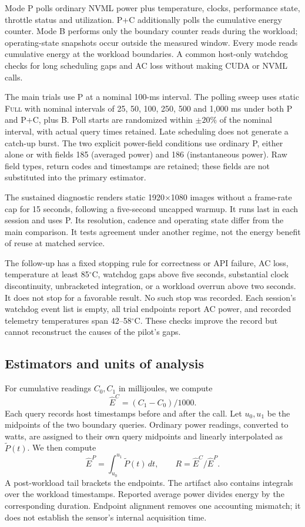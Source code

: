 \documentclass[10pt,conference]{IEEEtran}
\newcommand{\Full}{\textsc{Full}}
\begin{document}
Mode P polls ordinary NVML power plus temperature, clocks, performance state, throttle status and utilization. P+C additionally polls the cumulative energy counter. Mode B performs only the boundary counter reads during the workload; operating-state snapshots occur outside the measured window. Every mode reads cumulative energy at the workload boundaries. A common host-only watchdog checks for long scheduling gaps and AC loss without making CUDA or NVML calls.

The main trials use P at a nominal 100-ms interval. The polling sweep uses static \Full{} with nominal intervals of 25, 50, 100, 250, 500 and 1,000 ms under both P and P+C, plus B. Poll starts are randomized within $\pm20\%$ of the nominal interval, with actual query times retained. Late scheduling does not generate a catch-up burst. The two explicit power-field conditions use ordinary P, either alone or with fields 185 (averaged power) and 186 (instantaneous power). Raw field types, return codes and timestamps are retained; these fields are not substituted into the primary estimator.

The sustained diagnostic renders static 1920$\times$1080 images without a frame-rate cap for 15 seconds, following a five-second uncapped warmup. It runs last in each session and uses P. Its resolution, cadence and operating state differ from the main comparison. It tests agreement under another regime, not the energy benefit of reuse at matched service.

The follow-up has a fixed stopping rule for correctness or API failure, AC loss, temperature at least 85$^\circ$C, watchdog gaps above five seconds, substantial clock discontinuity, unbracketed integration, or a workload overrun above two seconds. It does not stop for a favorable result. No such stop was recorded. Each session's watchdog event list is empty, all trial endpoints report AC power, and recorded telemetry temperatures span 42--58$^\circ$C. These checks improve the record but cannot reconstruct the causes of the pilot's gaps.

\subsection{Estimators and units of analysis}
For cumulative readings $C_0,C_1$ in millijoules, we compute
\begin{equation}
\widehat E^C=(C_1-C_0)/1000.
\end{equation}
Each query records host timestamps before and after the call. Let $u_0,u_1$ be the midpoints of the two boundary queries. Ordinary power readings, converted to watts, are assigned to their own query midpoints and linearly interpolated as $\widetilde P(t)$. We then compute
\begin{equation}
\widehat E^P=\int_{u_0}^{u_1}\widetilde P(t)\,dt,\qquad
R=\widehat E^C/\widehat E^P.
\end{equation}
A post-workload tail brackets the endpoints. The artifact also contains integrals over the workload timestamps. Reported average power divides energy by the corresponding duration. Endpoint alignment removes one accounting mismatch; it does not establish the sensor's internal acquisition time.
\end{document}

